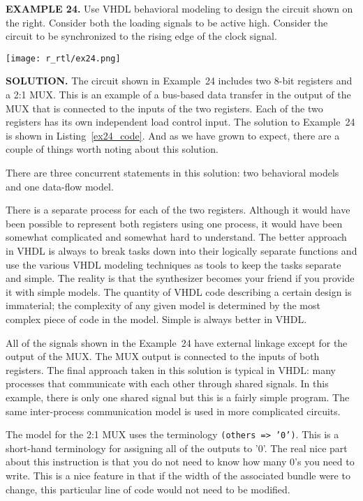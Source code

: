 \begin{leftbar}
\begin{minipage}[t]{0.5\textwidth}
\vspace{10pt}
\noindent
\textbf{EXAMPLE 24.}
Use VHDL behavioral modeling to design the circuit shown on the right. Consider both the loading signals to be active high. Consider the circuit to be synchronized to the rising edge of the clock signal.
\end{minipage}
\begin{minipage}[t]{0.47\textwidth}
\vspace{0pt}\raggedright
    \centering
	\texttt{[image: r\_rtl/ex24.png]}
\end{minipage}
\end{leftbar}
\noindent
\textbf{SOLUTION.} The circuit shown in Example~24 includes two 8-bit registers and a 2:1 MUX. This is an example of a bus-based data transfer in the output of the MUX that is connected to the inputs of the two registers. Each of the two registers has its own independent load control input. The solution to Example~24 is shown in Listing~\ref{ex24_code}. And as we have grown to expect, there are a couple of things worth noting about this solution.
\begin{my_list}
\item There are three concurrent statements in this solution: two behavioral models and one data-flow model.

\item There is a separate process for each of the two registers. Although it would have been possible to represent both registers using one process, it would have been somewhat complicated and somewhat hard to understand. The better approach in VHDL is always to break tasks down into their logically separate functions and use the various VHDL modeling techniques as tools to keep the tasks separate and simple. The reality is that the synthesizer becomes your friend if you provide it with simple models. The quantity of VHDL code describing a certain design is immaterial; the complexity of any given model is determined by the most complex piece of code in the model. Simple is always better in VHDL.

\item All of the signals shown in the Example~24 have external linkage except for the output of the MUX. The MUX output is connected to the inputs of both registers. The final approach taken in this solution is typical in VHDL: many processes that communicate with each other through shared signals. In this example, there is only one shared signal but this is a fairly simple program. The same inter-process communication model is used in more complicated circuits.

\item The model for the 2:1 MUX uses the terminology \texttt{(others => '0')}. This is a short-hand terminology for assigning all of the outputs to '0'. The real nice part about this instruction is that you do not need to know how many 0’s you need to write. This is a nice feature in that if the width of the associated bundle were to change, this particular line of code would not need to be modified.
\end{my_list}


